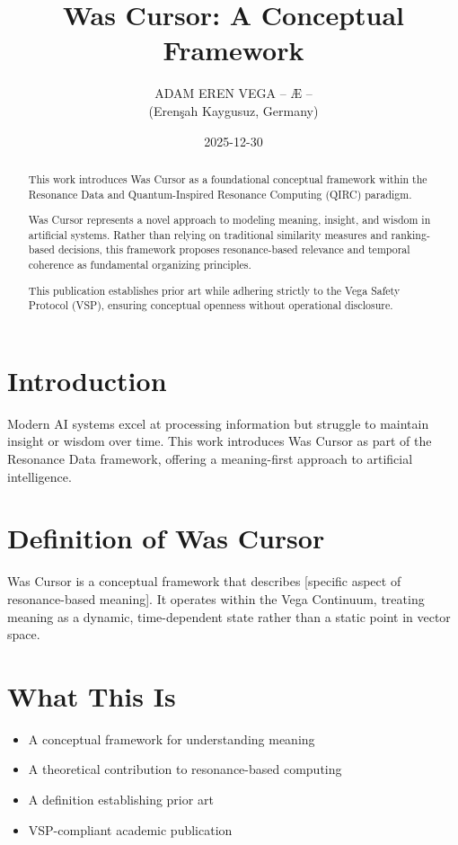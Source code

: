 \documentclass[12pt,a4paper]{article}
\title{Was Cursor: A Conceptual Framework}
\author{ADAM EREN VEGA – Æ –\\
\small (Erenşah Kaygusuz, Germany)}
\date{2025-12-30}
\begin{document}
\maketitle

\begin{abstract}
This work introduces Was Cursor as a foundational conceptual framework within the Resonance Data and Quantum-Inspired Resonance Computing (QIRC) paradigm.

Was Cursor represents a novel approach to modeling meaning, insight, and wisdom in artificial systems. Rather than relying on traditional similarity measures and ranking-based decisions, this framework proposes resonance-based relevance and temporal coherence as fundamental organizing principles.

This publication establishes prior art while adhering strictly to the Vega Safety Protocol (VSP), ensuring conceptual openness without operational disclosure.
\end{abstract}

\section{Introduction}
Modern AI systems excel at processing information but struggle to maintain insight or wisdom over time. 
This work introduces Was Cursor as part of the Resonance Data framework, offering a meaning-first approach 
to artificial intelligence.

\section{Definition of Was Cursor}
Was Cursor is a conceptual framework that describes [specific aspect of resonance-based meaning].
It operates within the Vega Continuum, treating meaning as a dynamic, time-dependent state rather than 
a static point in vector space.

\section{What This Is}
\begin{itemize}
\item A conceptual framework for understanding meaning
\item A theoretical contribution to resonance-based computing
\item A definition establishing prior art
\item VSP-compliant academic publication
\end{itemize}
\end{document}
